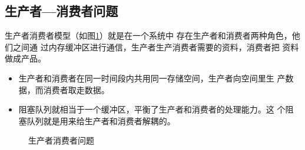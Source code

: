 \subsection{生产者—消费者问题}

生产者消费者模型（如图\ref{fig:producer-and-consumer}）就是在一个系统中
存在{\hei\Red 生产者}和{\hei\Red 消费者}两种角色，他们之间通
过{\hei\Blue 内存缓冲区}进行通信，生产者生产消费者需要的资料，消费者把
资料做成产品。
  

\begin{itemize}
\item 生产者和消费者在同一时间段内共用同一存储空间，生产者向空间里生
  产数据，而消费者取走数据。
\item 阻塞队列就相当于一个缓冲区，平衡了生产者和消费者的处理能力。这
  个阻塞队列就是用来给生产者和消费者解耦的。
\end{itemize}

\begin{figure}[htb]
\centering
{}
\caption{生产者消费者问题}
\label{fig:producer-and-consumer}
\end{figure}

